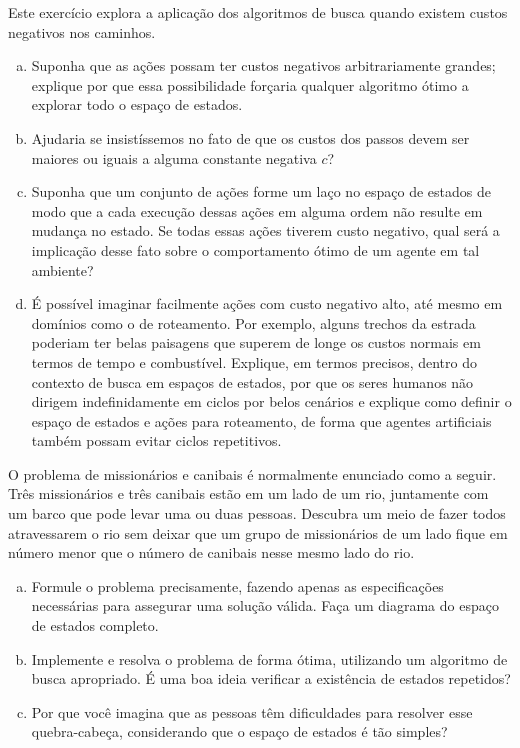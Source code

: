 \begin{exercise}
Este exercício explora a aplicação dos algoritmos de busca quando existem custos negativos nos caminhos.

\begin{enumerate}[a.]
	\item Suponha que as ações possam ter custos negativos arbitrariamente grandes; explique por que essa possibilidade forçaria qualquer algoritmo ótimo a explorar todo o espaço de estados.
	
	\item Ajudaria se insistíssemos no fato de que os custos dos passos devem ser maiores ou iguais a alguma constante negativa $c$?
	
	\item Suponha que um conjunto de ações forme um laço no espaço de estados de modo que a cada execução dessas ações em alguma ordem não resulte em mudança no estado. Se todas essas ações tiverem custo negativo, qual será a implicação desse fato sobre o comportamento ótimo de um agente em tal ambiente?
	
	\item É possível imaginar facilmente ações com custo negativo alto, até mesmo em domínios como o de roteamento. Por exemplo, alguns trechos da estrada poderiam ter belas paisagens que superem de longe os custos normais em termos de tempo e combustível. Explique, em termos precisos, dentro do contexto de busca em espaços de estados, por que os seres humanos não dirigem indefinidamente em ciclos por belos cenários e explique como definir o espaço de estados e ações para roteamento, de forma que agentes artificiais também possam evitar ciclos repetitivos.
\end{enumerate}
\end{exercise}

\begin{exercise}
O problema de missionários e canibais é normalmente enunciado como a seguir. Três missionários e três canibais estão em um lado de um rio, juntamente com um barco que pode levar uma ou duas pessoas. Descubra um meio de fazer todos atravessarem o rio sem deixar que um grupo de missionários de um lado fique em número menor que o número de canibais nesse mesmo lado do rio.

\begin{enumerate}[a.]
	\item Formule o problema precisamente, fazendo apenas as especificações necessárias para assegurar uma solução válida. Faça um diagrama do espaço de estados completo.
	
	\item Implemente e resolva o problema de forma ótima, utilizando um algoritmo de busca apropriado. É uma boa ideia verificar a existência de estados repetidos?
	
	\item Por que você imagina que as pessoas têm dificuldades para resolver esse quebra-cabeça, considerando que o espaço de estados é tão simples?
\end{enumerate}
\end{exercise}

